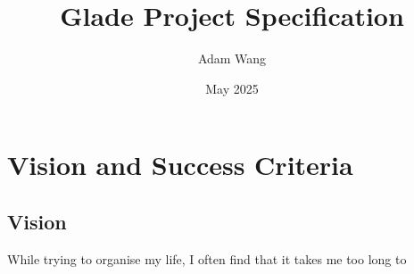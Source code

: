 \documentclass{article}
\title{Glade Project Specification}
\author{Adam Wang}
\date{May 2025}
\begin{document}
\maketitle

\section{Vision and Success Criteria}

\subsection{Vision}

While trying to organise my life, I often find that it takes me too long to 
\end{document}
